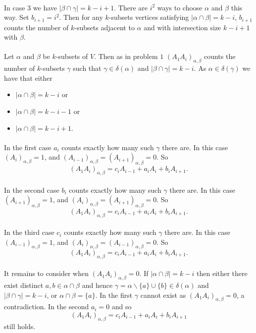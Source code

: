 \documentclass[letterpaper,12pt,oneside,onecolumn]{article}
\newcommand{\1}{\mathbbm{1}}
\begin{document}
\paragraph{}
In case $3$ we have $|\beta \cap \gamma | = k-i +1$. There are $i^2$ ways to choose $\alpha$ and $\beta$ this way. Set $b_{i+1} = i^2$. Then for any $k$-subsets vertices satisfying $|\alpha \cap \beta| = k-i$, $b_{i+1}$ counts the number of $k$-subsets adjacent to $\alpha$ and with intersection size $k-i+1$ with $\beta$.
\paragraph{}
Let $\alpha$ and $\beta$ be $k$-subsets of $V$. Then as in problem $1$ $(A_1A_i)_{\alpha,\beta}$ counts the number of $k$-subsets $\gamma$ such that $\gamma \in \delta(\alpha)$ and $|\beta \cap \gamma| = k-i$. As $\alpha \in \delta(\gamma)$ we have that either
\begin{itemize}
\item $|\alpha \cap \beta| = k-i$ or
\item $|\alpha \cap \beta| = k-i-1$ or
\item $|\alpha \cap \beta| = k-i + 1$.
\end{itemize}
\paragraph{}
In the first case $a_i$ counts exactly how many such $\gamma$ there are. In this case $(A_i)_{\alpha,\beta} = 1$, and $(A_{i-1})_{\alpha,\beta} = (A_{i+1})_{\alpha,\beta} = 0$. So
$$(A_1A_i)_{\alpha,\beta} = c_i A_{i-1} + a_iA_i + b_iA_{i+1}.$$
\paragraph{}
In the second case $b_i$ counts exactly how many such $\gamma$ there are. In this case $(A_{i+1})_{\alpha,\beta} = 1$, and $(A_{i})_{\alpha,\beta} = (A_{i+1})_{\alpha,\beta} = 0$. So
$$(A_1A_i)_{\alpha,\beta} = c_i A_{i-1} + a_iA_i + b_iA_{i+1}.$$
\paragraph{}
In the third case $c_i$ counts exactly how many such $\gamma$ there are. In this case $(A_{i-1})_{\alpha,\beta} = 1$, and $(A_{i})_{\alpha,\beta} = (A_{i-1})_{\alpha,\beta} = 0$. So
$$(A_1A_i)_{\alpha,\beta} = c_i A_{i-1} + a_iA_i + b_iA_{i+1}.$$
\paragraph{}
It remains to consider when $(A_1A_i)_{\alpha,\beta} = 0$. If $|\alpha \cap \beta| = k-i$ then either there exist distinct $a, b \in \alpha \cap \beta$ and hence $\gamma = \alpha \backslash\{a\} \cup \{b\}  \in \delta(\alpha)$ and $|\beta \cap \gamma| = k-i$, or $\alpha \cap \beta = \{a\}$. In the first $\gamma$ cannot exist as $(A_1A_i)_{\alpha,\beta} = 0$, a contradiction. In the second $a_i = 0$ and so
$$(A_1A_i)_{\alpha,\beta} = c_i A_{i-1} + a_iA_i + b_iA_{i+1}$$
still holds.
\end{document}
